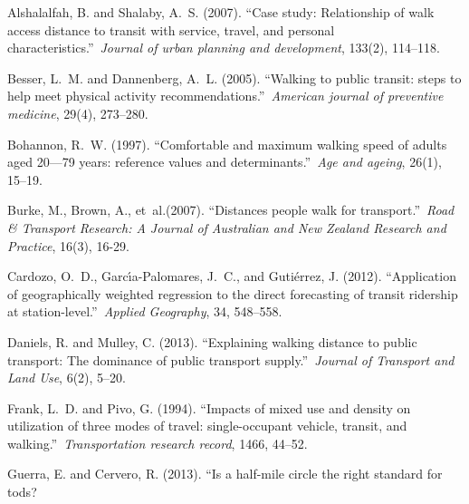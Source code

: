 \documentclass[sustainability,article,submit,moreauthors,pdftex,10pt,a4paper]{Definitions/mdpi}
\begin{document}
\begin{thebibliography}{999}
	
	Alshalalfah, B. and Shalaby, A.~S. (2007).
	\newblock ``Case study: Relationship of walk access distance to transit with
	service, travel, and personal characteristics.''\ {\em Journal of urban
		planning and development}, 133(2), 114--118.
	
	Besser, L.~M. and Dannenberg, A.~L. (2005).
	\newblock ``Walking to public transit: steps to help meet physical activity
	recommendations.''\ {\em American journal of preventive medicine}, 29(4),
	273--280.
	
	Bohannon, R.~W. (1997).
	\newblock ``Comfortable and maximum walking speed of adults aged 20—79 years:
	reference values and determinants.''\ {\em Age and ageing}, 26(1), 15--19.
	
	Burke, M., Brown, A., et~al.\@ (2007).
	\newblock ``Distances people walk for transport.''\ {\em Road \& Transport
		Research: A Journal of Australian and New Zealand Research and Practice},
	16(3), 16-29.
	
	Cardozo, O.~D., Garc{\'\i}a-Palomares, J.~C., and Guti{\'e}rrez, J. (2012).
	\newblock ``Application of geographically weighted regression to the direct
	forecasting of transit ridership at station-level.''\ {\em Applied
		Geography}, 34, 548--558.
	
	Daniels, R. and Mulley, C. (2013).
	\newblock ``Explaining walking distance to public transport: The dominance of
	public transport supply.''\ {\em Journal of Transport and Land Use}, 6(2),
	5--20.
	
	Frank, L.~D. and Pivo, G. (1994).
	\newblock ``Impacts of mixed use and density on utilization of three modes of
	travel: single-occupant vehicle, transit, and walking.''\ {\em Transportation
		research record}, 1466, 44--52.
	
	Guerra, E. and Cervero, R. (2013).
	\newblock ``Is a half-mile circle the right standard for tods?
	

\end{thebibliography}
\end{document}
